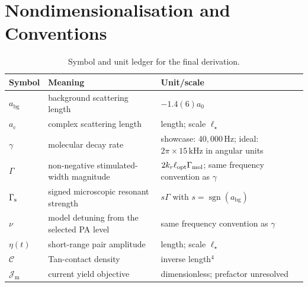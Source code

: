 \documentclass[9pt,a4paper,twocolumn,twoside]{rho-class/rho}
\newif\ifreportdraft
\newcommand{\draftnote}[1]{%
    \ifreportdraft
        \par\smallskip
        \noindent\textbf{\textsf{[TO COMPLETE]}} \textit{#1}
        \par\smallskip
    \fi
}
\newcommand{\ac}{a_{\mathrm{c}}}
\newcommand{\abg}{a_{\mathrm{bg}}}
\newcommand{\Jmol}{\mathcal{J}_{\mathrm{m}}}
\begin{document}
\section{Nondimensionalisation and Conventions}\label{app:nondimensionalisation}

    \draftnote{Complete the remaining contact and product-counting normalisation
    audit.  The optical-map sign and Hz-versus-rad/s conventions are derived in
    Appendix~\ref{app:ofr-map}; the unresolved issue here is the prefactor that
    converts lost-pair flux into counted product molecules.}

    \begin{table}[H]
        \caption{Symbol and unit ledger for the final derivation.}
        \label{tab:symbol-ledger}
        \setlength{\tabcolsep}{3pt}
        \begin{tabular}{>{\raggedright\arraybackslash}p{}>{\raggedright\arraybackslash}p{}>{\raggedright\arraybackslash}p{}}
            \toprule
            \textbf{Symbol} & \textbf{Meaning} & \textbf{Unit/scale} \\
            \midrule
            $\abg$ & background scattering length & $-1.4(6)a_0$ \\
            $\ac$ & complex scattering length & length; scale $\ell_\star$ \\
            $\gamma$ & molecular decay rate & showcase: $40{,}000\,\mathrm{Hz}$; ideal: $2\pi\times15\,\mathrm{kHz}$ in angular units \\
            $\Gamma$ & non-negative stimulated-width magnitude & $2k_r\ell_{\rm opt}\Gamma_{\rm mol}$; same frequency convention as $\gamma$ \\
            $\Gamma_{\rm s}$ & signed microscopic resonant strength & $s\Gamma$ with $s=\operatorname{sgn}(\abg)$ \\
            $\nu$ & model detuning from the selected PA level & same frequency convention as $\gamma$ \\
            $\eta(t)$ & short-range pair amplitude & length; scale $\ell_\star$ \\
            $\mathcal{C}$ & Tan-contact density & inverse length$^4$ \\
            $\Jmol$ & current yield objective & dimensionless; prefactor unresolved \\
            \bottomrule
        \end{tabular}
    \end{table}
\end{document}
